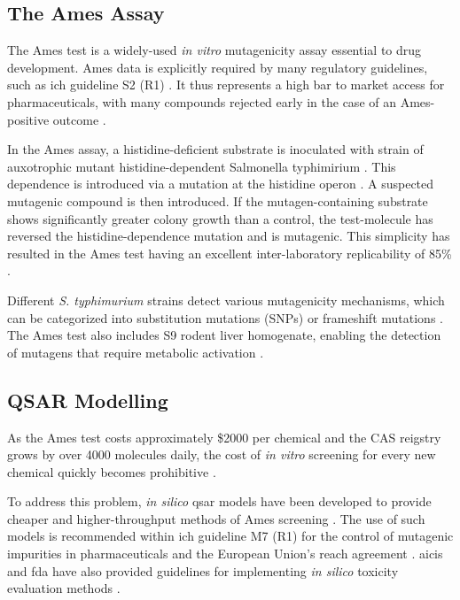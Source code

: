 \subsection{The Ames Assay}
The Ames test is a widely-used \textit{in vitro} mutagenicity assay essential to drug development. Ames data is explicitly required by many regulatory guidelines, such as \gls{ich} guideline S2 (R1) \cite{ich_ich_2013}. It thus represents a high bar to market access for pharmaceuticals, with many compounds rejected early in the case of an Ames-positive outcome \cite{honma_improvement_2019}.

In the Ames assay, a histidine-deficient substrate is inoculated with strain of auxotrophic mutant histidine-dependent Salmonella typhimirium \cite{ames_improved_1973}. This dependence is introduced via a mutation at the histidine operon \cite{ames_improved_1973}. A suspected mutagenic compound is then introduced. If the mutagen-containing substrate shows significantly greater colony growth than a control, the test-molecule has reversed the histidine-dependence mutation and is mutagenic. This simplicity has resulted in the Ames test having an excellent inter-laboratory replicability of 85\% \cite{kamber_comparison_2009}.

Different \textit{S. typhimurium} strains detect various mutagenicity mechanisms, which can be categorized into substitution mutations (SNPs) or frameshift mutations \cite{lui_mechanistic_2023}. The Ames test also includes S9 rodent liver homogenate, enabling the detection of mutagens that require metabolic activation \cite{maron_revised_1983, ames_improved_1973}.

\subsection{QSAR Modelling}
As the Ames test costs approximately \$2000 per chemical and the CAS reigstry grows by over 4000 molecules daily, the cost of \textit{in vitro} screening for every new chemical quickly becomes prohibitive \cite{honma_improvement_2019}.

To address this problem, \textit{in silico} \gls{qsar} models have been developed to provide cheaper and higher-throughput methods of Ames screening \cite{furuhama_evaluation_2023}. The use of such models is recommended within \gls{ich} guideline M7 (R1) for the control of mutagenic impurities in pharmaceuticals and the European Union's \gls{reach} agreement \cite{european_communities_regulation_2006, ich_assessment_2017, honma_improvement_2019}. \Gls{aicis} and \gls{fda} have also provided guidelines for implementing \textit{in silico} toxicity evaluation methods \cite{aicis_guide_2022, han_fda_2023}.

